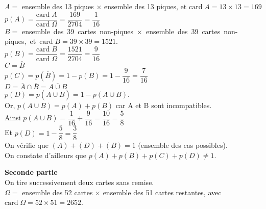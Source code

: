 \vspace*{.3cm }
$ A = $ ensemble des 13 piques $ \times $ ensemble des 13 piques, et $\mathrm{card} \; A = 13 \times 13 = 169 $ \\

$ p\left(A\right) = \dfrac{\mathrm{card} \; A}{\mathrm{card} \; \Omega} = \dfrac{169}{2704} = \dfrac{1}{16} $ \\

$ B = $ \hbox{ensemble des 39 cartes non-piques $ \times $ ensemble des 39 cartes non-piques, et $\mathrm{card} \; B = 39 \times 39 = 1521 $.} \\

$ p\left(B\right) = \dfrac{\mathrm{card} \; B}{\mathrm{card} \; \Omega} = \dfrac{1521}{2704} = \dfrac{9}{16} $ \\

$ C = \overline{B} $ \\

$ p\left(C\right) = p\left(\overline{B} \right) = 1 - p\left(B\right) = 1 - \dfrac{9}{16} = \dfrac{7}{16} $ \\

$ D = \overline{A} \cap \overline{B} = \overline{A \cup B} $ \\

$ p\left(D\right) = p\left(\overline{A\cup B}\right) = 1 - p\left(A\cup B\right)$.  \\

Or, $p\left(A\cup B\right) = p\left(A\right) + p\left(B\right) $ car A et B sont incompatibles. \\

Ainsi $p\left(A\cup B\right) = \dfrac{1}{16} + \dfrac{9}{16} = \dfrac{10}{16} = \dfrac{5}{8} $ \\

Et $p\left(D\right) = 1 - \dfrac{5}{8} = \dfrac{3}{8} $ \\

On vérifie que $\left(A\right) + \left(D\right) + \left(B\right) = 1$ (ensemble des cas possibles). \\ On constate d'ailleurs que $p\left(A\right) + p\left(B\right) + p\left(C\right) + p\left(D\right) \neq 1 $.

\newpage

\textbf{Seconde partie} \\

On tire successivement deux cartes sans remise. \\

$\Omega =$  ensemble des 52 cartes $ \times $ ensemble des 51 cartes restantes, avec $\mathrm{card} \; \Omega = 52 \times 51 = 2652 $. \\

